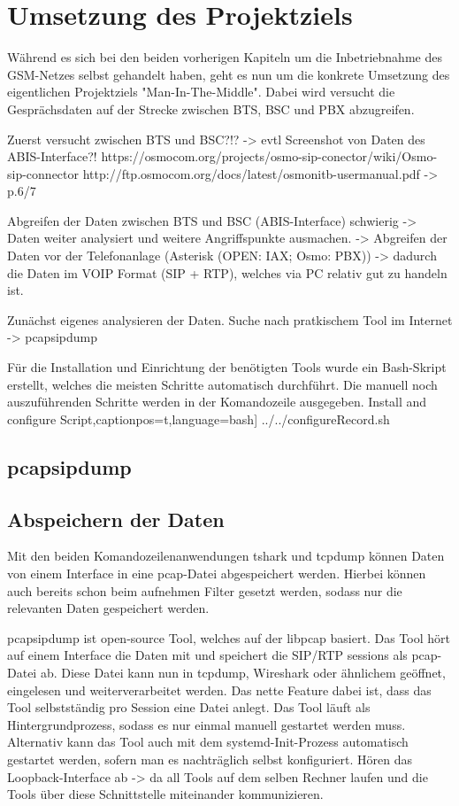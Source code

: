 \section{Umsetzung des Projektziels}
Während es sich bei den beiden vorherigen Kapiteln um die Inbetriebnahme des GSM-Netzes selbst gehandelt haben, geht es nun um die konkrete Umsetzung des eigentlichen Projektziels "Man-In-The-Middle". Dabei wird versucht die Gesprächsdaten auf der Strecke zwischen BTS, BSC und PBX abzugreifen.

Zuerst versucht zwischen BTS und BSC?!?
-> evtl Screenshot von Daten des ABIS-Interface?!
https://osmocom.org/projects/osmo-sip-conector/wiki/Osmo-sip-connector
http://ftp.osmocom.org/docs/latest/osmonitb-usermanual.pdf -> p.6/7

Abgreifen der Daten zwischen BTS und BSC (ABIS-Interface) schwierig -> Daten weiter analysiert und weitere Angriffspunkte ausmachen.
-> Abgreifen der Daten vor der Telefonanlage (Asterisk (OPEN: IAX; Osmo: PBX)) -> dadurch die Daten im VOIP Format (SIP + RTP), welches via PC relativ gut zu handeln ist.

Zunächst eigenes analysieren der Daten. Suche nach pratkischem Tool im Internet
-> pcapsipdump

Für die Installation und Einrichtung der benötigten Tools wurde ein Bash-Skript erstellt, welches die meisten Schritte automatisch durchführt. Die manuell noch auszuführenden Schritte werden in der Komandozeile ausgegeben.
{Install and configure Script}\label{lst:configure.sh},captionpos=t,language=bash]
{../../configureRecord.sh}


\subsection{pcapsipdump}
\subsection{Abspeichern der Daten}
Mit den beiden Komandozeilenanwendungen tshark und tcpdump können Daten von einem Interface in eine pcap-Datei abgespeichert werden. Hierbei können auch bereits schon beim aufnehmen Filter gesetzt werden, sodass nur die relevanten Daten gespeichert werden.


pcapsipdump ist open-source Tool, welches auf der libpcap basiert. Das Tool hört auf einem Interface die Daten mit und speichert die SIP/RTP sessions als pcap-Datei ab. Diese Datei kann nun in tcpdump, Wireshark oder ähnlichem geöffnet, eingelesen und weiterverarbeitet werden. Das nette Feature dabei ist, dass das Tool selbstständig pro Session eine Datei anlegt. Das Tool läuft als Hintergrundprozess, sodass es nur einmal manuell gestartet werden muss. Alternativ kann das Tool auch mit dem systemd-Init-Prozess automatisch gestartet werden, sofern man es nachträglich selbst konfiguriert.
Hören das Loopback-Interface ab -> da all Tools auf dem selben Rechner laufen und die Tools über diese Schnittstelle miteinander kommunizieren.

